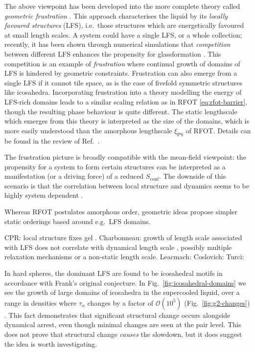 \documentclass[11pt,twoside]{report}
\begin{document}
The above viewpoint has been developed into the more complete theory called \emph{geometric frustration} \cite{KivelsonPA1995,TarjusJPCM2005}.
This approach characterises the liquid by its \emph{locally favoured structures} (LFS), i.e.\ those structures which are energetically favoured at small length scales.
A system could have a single LFS, or a whole collection; recently, it has been shown through numerical simulations that \emph{competition} between different LFS enhances the propensity for glassformation \cite{TeichNC2019}.
This competition is an example of \emph{frustration} where continual growth of domains of LFS is hindered by geometric constraints.
Frustration can also emerge from a single LFS if it cannot tile space, as is the case of fivefold symmetric structures like icosahedra.
Incorporating frustration into a theory modelling the energy of LFS-rich domains leads to a similar scaling relation as in RFOT \eqref{eq:rfot-barrier}, though the resulting phase behaviour is quite different.
The static lengthscale which emerges from this theory is interpreted as the size of the domains, which is more easily understood than the amorphous lengthscale $\xi_\mathrm{PS}$ of RFOT.
Details can be found in the review of Ref.\ \cite{TarjusJPCM2005}.

The frustration picture is broadly compatible with the mean-field viewpoint: the propensity for a system to form certain structures can be interpreted as a manifestation (or a driving force) of a reduced $S_\mathrm{conf}$.
The downside of this scenario is that the correlation between local structure and dynamics seems to be highly system dependent \cite{HockyPRL2014}.

Whereas RFOT postulates amorphous order, geometric ideas propose simpler static orderings based around e.g.\ LFS domains.

CPR: local structure fixes gel \cite{RoyallNM2008}.
Charbonneau: growth of length scale associated with LFS does not correlate with dynamical length scale \cite{CharbonneauPRL2012}, possibly multiple relaxation mechanisms or a non-static length scale.
Leacmach: \cite{LeocmachNC2012}
Coslovich: \cite{CoslovichJCP2007,CoslovichJCP2007a}
Turci: \cite{TurciPRL2017}

In hard spheres, the dominant LFS are found to be icosahedral motifs in accordance with Frank's original conjecture.
In Fig.\ \ref{fig:icosahedral-domains} we see the growth of large domains of icosahedra in the supercooled liquid, over a range in densities where $\tau_\alpha$ changes by a factor of $\mathcal{O}(10^5)$ (Fig.\ \ref{fig:g2-changes}) \cite{HallettNC2018}.
This fact demonstrates that significant structural change occurs alongside dynamical arrest, even though minimal changes are seen at the pair level.
This does not prove that structural change \emph{causes} the slowdown, but it does suggest the idea is worth investigating.
\end{document}
